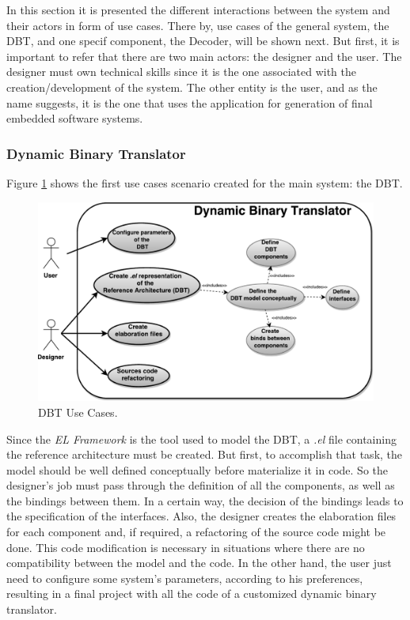 In this section it is presented the different interactions between the system and their actors in form of use cases. There by, use cases of the general system, the DBT, and one specif component, the Decoder, will be shown next. But first, it is important to refer that there are two main actors: the designer and the user. The designer must own technical skills since it is the one associated with the creation/development of the system. The other entity is the user, and as the name suggests, it is the one that uses the application for generation of final embedded software systems.


\subsubsection{Dynamic Binary Translator}

Figure \ref{fig:DBTUseCases} shows the first use cases scenario created for the main system: the DBT.

\begin{figure}[!htb]
\centerline{
\includegraphics[scale=0.6]{images/DBT_UseCases.pdf} }
\caption{DBT Use Cases.}
\label{fig:DBTUseCases} 
\end{figure}

Since the \textit{EL Framework} is the tool used to model the DBT, a \textit{.el} file containing the reference architecture must be created. But first, to accomplish that task, the model should be well defined conceptually before materialize it in code. So the designer's job must pass through the definition of all the components, as well as the bindings between them. In a certain way, the decision of the bindings leads to the specification of the interfaces. Also, the designer creates the elaboration files for each component and, if required, a refactoring of the source code might be done. This code modification is necessary in situations where there are no compatibility between the model and the code. In the other hand, the user just need to configure some system's parameters, according to his preferences, resulting in a final project with all the code of a customized dynamic binary translator.

